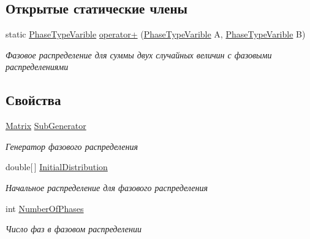 \subsection*{Открытые статические члены}
\begin{DoxyCompactItemize}
\item 
static \hyperlink{class_phase_type_distribution_1_1_phase_type_varible}{Phase\+Type\+Varible} \hyperlink{class_phase_type_distribution_1_1_phase_type_varible_a357bb39985c894e157773327ffba36af}{operator+} (\hyperlink{class_phase_type_distribution_1_1_phase_type_varible}{Phase\+Type\+Varible} A, \hyperlink{class_phase_type_distribution_1_1_phase_type_varible}{Phase\+Type\+Varible} B)
\begin{DoxyCompactList}\small\item\em Фазовое распределение для суммы двух случайных величин с фазовыми распределениями \end{DoxyCompactList}\end{DoxyCompactItemize}
\subsection*{Свойства}
\begin{DoxyCompactItemize}
\item 
\hyperlink{class_b_l_a_s_1_1_matrix}{Matrix} \hyperlink{class_phase_type_distribution_1_1_phase_type_varible_a9832e75be88711d5939e808aea3b4121}{Sub\+Generator}
\begin{DoxyCompactList}\small\item\em Генератор фазового распределения \end{DoxyCompactList}\item 
double\mbox{[}$\,$\mbox{]} \hyperlink{class_phase_type_distribution_1_1_phase_type_varible_ac9102d397b010f61b97cda69acfdb31b}{Initial\+Distribution}
\begin{DoxyCompactList}\small\item\em Начальное распределение для фазового распределения \end{DoxyCompactList}\item 
int \hyperlink{class_phase_type_distribution_1_1_phase_type_varible_a1bfaf7709c227b28fbbc89b808a89bfe}{Number\+Of\+Phases}
\begin{DoxyCompactList}\small\item\em Число фаз в фазовом распределении \end{DoxyCompactList}\end{DoxyCompactItemize}
